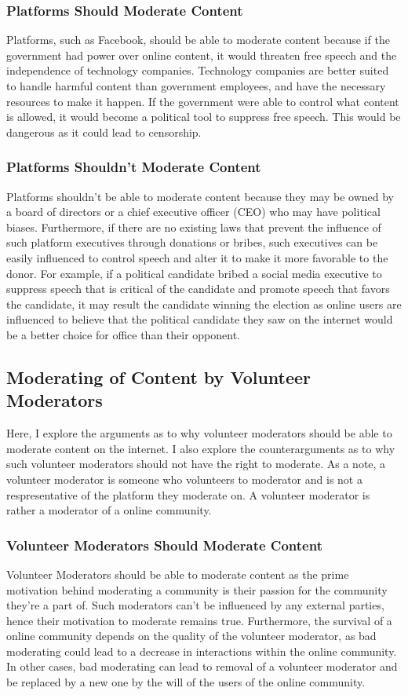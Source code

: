 \documentclass[a4paper]{article}
\begin{document}
\subsubsection{Platforms Should Moderate Content}
Platforms, such as Facebook, should be able to moderate content because if the government had power over online
content, it would threaten free speech and the independence of technology companies. Technology companies are better
suited to handle harmful content than government employees, and have the necessary resources to make it happen. If
the government were able to control what content is allowed, it would become a political tool to suppress free speech.
This would be dangerous as it could lead to censorship.

\subsubsection{Platforms Shouldn't Moderate Content}
Platforms shouldn't be able to moderate content because they may be owned by a board of directors or a chief executive
officer (CEO) who may have political biases. Furthermore, if there are no existing laws that prevent the influence
of such platform executives through donations or bribes, such executives can be easily influenced to control speech
and alter it to make it more favorable to the donor. For example, if a political candidate bribed a social media 
executive to suppress speech that is critical of the candidate and promote speech that favors the candidate, it may
result the candidate winning the election as online users are influenced to believe that the political candidate they
saw on the internet would be a better choice for office than their opponent.

\subsection{Moderating of Content by Volunteer Moderators}
Here, I explore the arguments as to why volunteer moderators should be able to moderate content on the internet. 
I also explore the counterarguments as to why such volunteer moderators should not have the right to moderate. As a 
note, a volunteer moderator is someone who volunteers to moderator and is not a respresentative of the platform
they moderate on. A volunteer moderator is rather a moderator of a online community.

\subsubsection{Volunteer Moderators Should Moderate Content}
Volunteer Moderators should be able to moderate content as the prime motivation behind moderating a community is their
passion for the community they're a part of. Such moderators can't be influenced by any external parties, hence their
motivation to moderate remains true. Furthermore, the survival of a online community depends on the quality of the 
volunteer moderator, as bad moderating could lead to a decrease in interactions within the online community. In other
cases, bad moderating can lead to removal of a volunteer moderator and be replaced by a new one by the will of the 
users of the online community.
\end{document}
